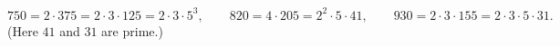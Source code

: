 \[750=2\cdot375=2\cdot3\cdot125=\boxed{2\cdot3\cdot5^3},\qquad 820=4\cdot205=\boxed{2^2\cdot5\cdot41},\qquad 930=2\cdot3\cdot155=\boxed{2\cdot3\cdot5\cdot31}.\]
(Here $41$ and $31$ are prime.)
